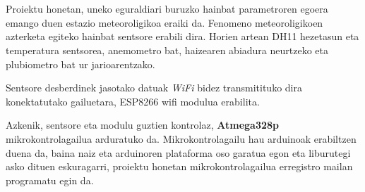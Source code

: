 \chapter*{\abstract}
\setcounter{page}{1}

Proiektu honetan, uneko eguraldiari buruzko hainbat parametroren egoera emango duen estazio meteoroligikoa eraiki da. Fenomeno meteoroligikoen azterketa egiteko hainbat sentsore erabili dira. Horien artean DH11 hezetasun eta temperatura sentsorea, anemometro bat, haizearen abiadura neurtzeko eta plubiometro bat ur jarioarentzako. 

Sentsore desberdinek jasotako datuak \textit{WiFi} bidez transmitituko dira konektatutako gailuetara, ESP8266 wifi modulua erabilita. 

Azkenik, sentsore eta modulu guztien kontrolaz, \textbf{Atmega328p} mikrokontrolagailua arduratuko da. Mikrokontrolagailu hau arduinoak erabiltzen duena da, baina naiz eta arduinoren plataforma oso garatua egon eta liburutegi asko dituen eskuragarri, proiektu honetan mikrokontrolagailua erregistro mailan programatu egin da.

